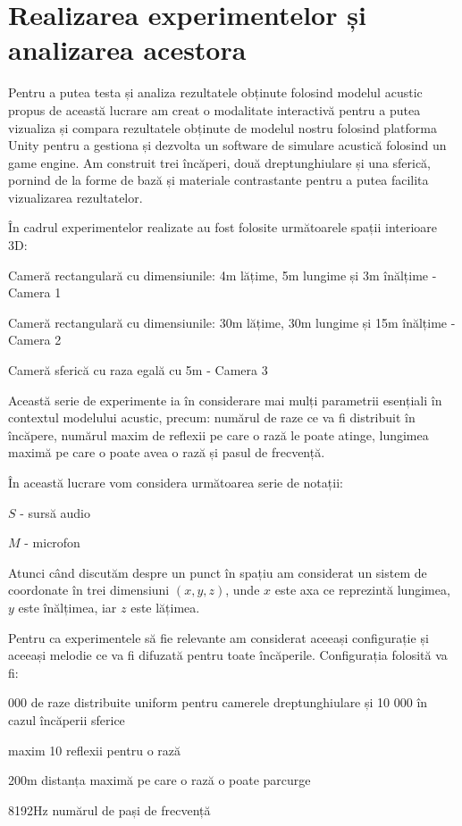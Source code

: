 \section{Realizarea experimentelor și analizarea acestora}

	Pentru a putea testa și analiza rezultatele obținute folosind modelul acustic propus de această lucrare am creat o modalitate interactivă pentru a putea vizualiza și compara rezultatele obținute de modelul nostru folosind platforma Unity pentru a gestiona și dezvolta un software de simulare acustică folosind un game engine. Am construit trei încăperi, două dreptunghiulare și una sferică, pornind de la forme de bază și materiale contrastante pentru a putea facilita vizualizarea rezultatelor. 
	
	În cadrul experimentelor realizate au fost folosite următoarele spații interioare 3D:
	
	\begin{itemize}
		\utb Cameră rectangulară cu dimensiunile: 4m lățime, 5m lungime și 3m înălțime - Camera 1 
		
		\utb Cameră rectangulară cu dimensiunile: 30m lățime, 30m lungime și 15m înălțime - Camera 2 
		
		\utb Cameră sferică cu raza egală cu 5m - Camera 3 
	\end{itemize}

	Această serie de experimente ia în considerare mai mulți parametrii esențiali în contextul modelului acustic, precum: numărul de raze ce va fi distribuit în încăpere, numărul maxim de reflexii pe care o rază le poate atinge, lungimea maximă pe care o poate avea o rază și pasul de frecvență.	
	
	În această lucrare vom considera următoarea serie de notații:
	\begin{itemize}
		\utb $S$ - sursă audio
		
		\utb $M$ - microfon 
	\end{itemize}

	Atunci când discutăm despre un punct în spațiu am considerat un sistem de coordonate în trei dimensiuni $(x,y,z)$, unde $x$ este axa ce reprezintă lungimea, $y$ este înălțimea, iar $z$ este lățimea.
	
	Pentru ca experimentele să fie relevante am considerat aceeași configurație și aceeași melodie ce va fi difuzată pentru toate încăperile. Configurația folosită va fi:
	
	\begin{itemize}
		 000 de raze distribuite uniform pentru camerele dreptunghiulare și 10 000 în cazul încăperii sferice
		
		\utb maxim 10 reflexii pentru o rază
		
		\utb 200m distanța maximă pe care o rază o poate parcurge
		
		\utb 8192Hz numărul de pași de frecvență
	\end{itemize}

